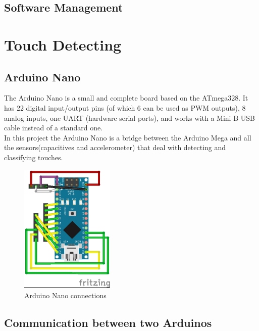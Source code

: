\subsection{Software Management}
\section{Touch Detecting}
\subsection{Arduino Nano}
The Arduino Nano is a small and complete board based on the ATmega328. It has 22 digital input/output pins (of which 6 can be used as PWM outputs), 8 analog inputs, one UART (hardware serial ports), and works with a Mini-B USB cable instead of a standard one\cite{arduino:nano}.\\
In this project the Arduino Nano is a bridge between the Arduino Mega and all the sensors(capacitives and accelerometer) that deal with detecting and classifying touches.
\begin{figure}[h]
	\centering
	\includegraphics[width=0.4\textwidth]{arduinoMicroSchema_bb}
	\caption{Arduino Nano connections}
	\label{nanoConnections}
\end{figure}

\subsection{Communication between two Arduinos}

